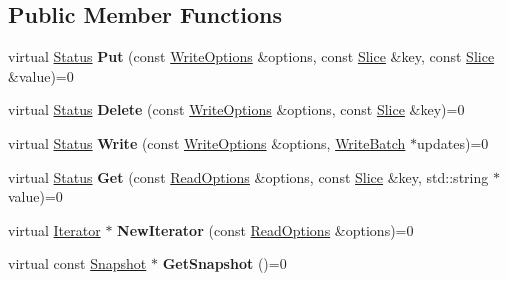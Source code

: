 \subsection*{Public Member Functions}
\begin{DoxyCompactItemize}
\item 
\mbox{\label{classleveldb_1_1_d_b_ac2e472812630ed74298df7b03b08c1ae}} 
virtual \mbox{\hyperlink{classleveldb_1_1_status}{Status}} {\bfseries Put} (const \mbox{\hyperlink{structleveldb_1_1_write_options}{Write\+Options}} \&options, const \mbox{\hyperlink{classleveldb_1_1_slice}{Slice}} \&key, const \mbox{\hyperlink{classleveldb_1_1_slice}{Slice}} \&value)=0
\item 
\mbox{\label{classleveldb_1_1_d_b_aff7577239799cd059464701c548090b9}} 
virtual \mbox{\hyperlink{classleveldb_1_1_status}{Status}} {\bfseries Delete} (const \mbox{\hyperlink{structleveldb_1_1_write_options}{Write\+Options}} \&options, const \mbox{\hyperlink{classleveldb_1_1_slice}{Slice}} \&key)=0
\item 
\mbox{\label{classleveldb_1_1_d_b_ae0b6ded8c8e0b88ff70190bf7a0c086c}} 
virtual \mbox{\hyperlink{classleveldb_1_1_status}{Status}} {\bfseries Write} (const \mbox{\hyperlink{structleveldb_1_1_write_options}{Write\+Options}} \&options, \mbox{\hyperlink{classleveldb_1_1_write_batch}{Write\+Batch}} $\ast$updates)=0
\item 
\mbox{\label{classleveldb_1_1_d_b_ad43bd7937b9af88ff856eb8158890911}} 
virtual \mbox{\hyperlink{classleveldb_1_1_status}{Status}} {\bfseries Get} (const \mbox{\hyperlink{structleveldb_1_1_read_options}{Read\+Options}} \&options, const \mbox{\hyperlink{classleveldb_1_1_slice}{Slice}} \&key, std\+::string $\ast$value)=0
\item 
\mbox{\label{classleveldb_1_1_d_b_a5629308235de24c05c286c353d4e7d32}} 
virtual \mbox{\hyperlink{classleveldb_1_1_iterator}{Iterator}} $\ast$ {\bfseries New\+Iterator} (const \mbox{\hyperlink{structleveldb_1_1_read_options}{Read\+Options}} \&options)=0
\item 
\mbox{\label{classleveldb_1_1_d_b_a7d13f6336c7c5f0bf79578d57c45568c}} 
virtual const \mbox{\hyperlink{classleveldb_1_1_snapshot}{Snapshot}} $\ast$ {\bfseries Get\+Snapshot} ()=0

\end{DoxyCompactItemize}
